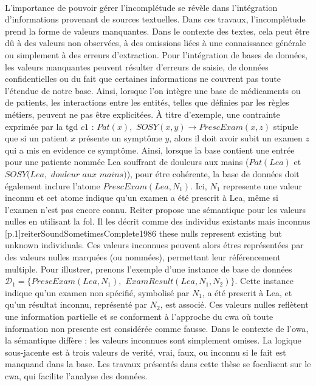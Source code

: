 \paragraph{}
L'importance de pouvoir gérer l'incomplétude se révèle dans l'intégration d'informations provenant de sources textuelles.
Dans ces travaux, l'incomplétude prend la forme de valeurs manquantes.
Dans le contexte des textes, cela peut être dû à des valeurs non observées, à des omissions liées à une connaissance générale ou simplement à des erreurs d'extraction.
Pour l'intégration de bases de données, les valeurs manquantes peuvent résulter d'erreurs de saisie, de données confidentielles ou du fait que certaines informations ne couvrent pas toute l'étendue de notre base.
Ainsi, lorsque l'on intègre une base de médicaments ou de patients, les interactions entre les entités, telles que définies par les règles métiers, peuvent ne pas être explicitées.
À titre d'exemple, une contrainte exprimée par la \gls{tgd} $c1$ : $Pat(x),$ $SOSY(x, y) \rightarrow PrescExam(x, z)$ stipule que si un patient $x$ présente un symptôme $y$, alors il doit avoir subit un examen $z$ qui a mis en evidence ce symptôme.
Ainsi, lorsque la base contient une entrée pour une patiente nommée Lea souffrant de douleurs aux mains ($Pat(Lea)$ et $ SOSY(Lea,$ $\textit{douleur aux mains})$), pour étre cohérente, la base de données doit également inclure l'atome $PrescExam(Lea, N_1)$.
Ici, $N_1$ represente une valeur inconnu et cet atome indique qu'un examen a été prescrit à Lea, même si l'examen n'est pas encore connu.
Reiter propose une sémantique pour les valeurs nulles en utilisant la \gls{fol}.
Il les décrit comme des individus existants mais inconnus [p.1]{reiterSoundSometimesComplete1986}{\label{reiterSemantic}\textelp{} these nulls represent existing but unknown individuals}.
Ces valeurs inconnues peuvent alors étres représentées par des valeurs nulles marquées (ou nommées), permettant leur référencement multiple.
Pour illustrer, prenons l'exemple d'une instance de base de données $\mathcal{D}_1= \{PrescExam(Lea, N_1),$ $ExamResult(Lea, N_1, N_2)\}$.
Cette instance indique qu'un examen non spécifié, symbolisé par $N_1$, a été prescrit à Lea, et qu'un résultat inconnu, représenté par $N_2$, est associé.
Ces valeurs nulles reflètent une information partielle et se conforment à l'approche du \gls{cwa} où toute information non presente est considérée comme fausse.
Dans le contexte de l'\gls{owa}, la sémantique diffère : les valeurs inconnues sont simplement omises. %
La logique sous-jacente est à trois valeurs de verité, vrai, faux, ou inconnu si le fait est manquand dans la base.
Les travaux présentés dans cette thèse se focalisent sur le \gls{cwa}, qui facilite l'analyse des données. %

